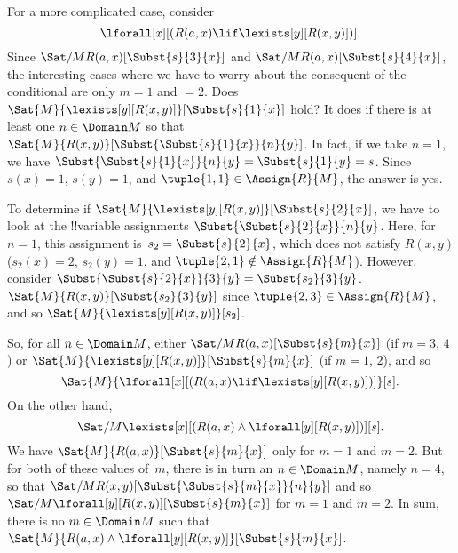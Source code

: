 \documentclass[../../../include/open-logic-section]{subfiles}
\begin{document}
\begin{ex}

For a more complicated case, consider
\[
\lforall[x][(R(a,x) \lif \lexists[y][R(x,y)])].
\]
Since $\Sat/{M}{R(a,x)}[\Subst{s}{3}{x}]$ and
$\Sat/{M}{R(a,x)}[\Subst{s}{4}{x}]$, the interesting cases where we
have to worry about the consequent of the conditional are only $m = 1$
and $ = 2$. Does $\Sat{M}{\lexists[y][R(x,y)]}[\Subst{s}{1}{x}]$
hold? It does if there is at least one $n \in \Domain M$ so that
$\Sat{M}{R(x,y)}[\Subst{\Subst{s}{1}{x}}{n}{y}]$. In fact, if we take
$n = 1$, we have $\Subst{\Subst{s}{1}{x}}{n}{y} = \Subst{s}{1}{y} =
s$. Since $s(x) = 1$, $s(y) = 1$, and $\tuple{1,1} \in \Assign{R}{M}$,
the answer is yes. 

To determine if $\Sat{M}{\lexists[y][R(x,y)]}[\Subst{s}{2}{x}]$, we
have to look at the !!{variable} assignments
$\Subst{\Subst{s}{2}{x}}{n}{y}$. Here, for $n = 1$, this assignment
is~$s_2 = \Subst{s}{2}{x}$, which does not satisfy $R(x,y)$ ($s_2(x) =
2$, $s_2(y) = 1$, and $\tuple{2,1}\notin \Assign{R}{M}$). However,
consider $\Subst{\Subst{s}{2}{x}}{3}{y} = \Subst{s_2}{3}{y}$.
$\Sat{M}{R(x,y)}[\Subst{s_2}{3}{y}]$ since $\tuple{2,3} \in
\Assign{R}{M}$, and so $\Sat{M}{\lexists[y][R(x,y)]}[s_2]$.

So, for all $n \in \Domain M$, either
$\Sat/{M}{R(a,x)}[\Subst{s}{m}{x}]$ (if $m = 3$, $4$) or
$\Sat{M}{\lexists[y][R(x,y)]}[\Subst{s}{m}{x}]$ (if $m = 1$, $2$), and so
\[
\Sat{M}{\lforall[x][(R(a,x) \lif \lexists[y][R(x,y)])]}[s].
\]
On the other hand,
\[
\Sat/{M}{\lexists[x][(R(a,x) \land \lforall[y][R(x,y)])]}[s].
\]
We have $\Sat{M}{R(a,x)}[\Subst{s}{m}{x}]$ only for $m = 1$ and $m =
2$. But for both of these values of~$m$, there is in turn an $n \in
\Domain M$, namely $n = 4$, so that
$\Sat/{M}{R(x,y)}[\Subst{\Subst{s}{m}{x}}{n}{y}]$ and so
$\Sat/{M}{\lforall[y][R(x,y)]}[\Subst{s}{m}{x}]$ for $m = 1$ and $m =
2$. In sum, there is no $m \in \Domain M$ such that $\Sat{M}{R(a,x)
\land \lforall[y][R(x,y)]}[\Subst{s}{m}{x}]$.
\end{ex}
\end{document}

